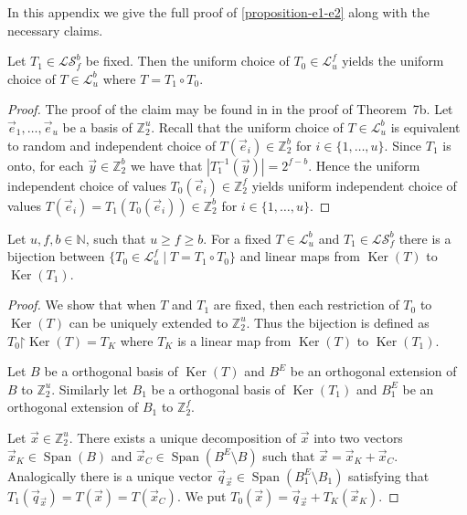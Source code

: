 \documentclass[unicode,review]{siamart1116}
\newcommand{\vecspace}[2]{\mathbb{Z}_{#1}^{#2}}
\newcommand{\binvecspace}[1]{\vecspace{2}{#1}}
\newcommand{\linearmaps}[2]{\mathcal{L}_{#1}^{#2}}
\newcommand{\surjectivelinearmaps}[2]{\mathcal{LS}_{#1}^{#2}}
\numberwithin{theorem}{section}
\begin{document}
\begin{appendix}
In this appendix we give the full proof of \cref{proposition-e1-e2} along with the necessary claims. 
\begin{proposition}
\label{claim-dstr-factor}
Let $T_1 \in \surjectivelinearmaps{f}{b}$ be fixed. Then the uniform choice of $T_0 \in \linearmaps{u}{f}$ yields the uniform choice of $T \in \linearmaps{u}{b}$ where $T = T_1 \circ T_0 $.
\end{proposition}
\begin{proof}
The proof of the claim may be found in \cite{alonetal} in the proof of Theorem~7b.
Let $\vec{e}_1, \dots, \vec{e}_u$ be a basis of $\binvecspace{u}$.
Recall that the uniform choice of $T \in \linearmaps{u}{b}$ is equivalent to random and independent choice of $T(\vec{e}_i) \in \binvecspace{b}$ for $i \in \{1, \dots, u\}$.
Since $T_1$ is onto, for each $\vec{y} \in \binvecspace{b}$ we have that $|T_1^{-1}(\vec{y})| = 2^{f - b}$.
Hence the uniform independent choice of values $T_0(\vec{e}_i) \in \binvecspace{f}$ yields uniform independent choice of values $T(\vec{e}_i) = T_1(T_0(\vec{e}_i)) \in \binvecspace{b}$ for $i \in \{1, \dots, u\}$.
\end{proof}

\begin{proposition}
\label{proposition-affine-model}
Let $u, f, b \in \mathbb{N}$, such that $u \geq f \geq b$.
For a fixed $T \in \linearmaps{u}{b}$ and $T_1 \in \surjectivelinearmaps{f}{b}$ there is a bijection between $\{ T_0 \in \linearmaps{u}{f} \mid T = T_1 \circ T_0 \}$ and linear maps from $\operatorname{Ker}(T)$ to $\operatorname{Ker}(T_1)$.
\end{proposition}
\begin{proof}
We show that when $T$ and $T_1$ are fixed, then each restriction of $T_0$ to $\operatorname{Ker}(T)$ can be uniquely extended to $\binvecspace{u}$.
Thus the bijection is defined as $T_0\mathord{\upharpoonright}\operatorname{Ker}(T) = T_K$ where $T_K$ is a linear map from $\operatorname{Ker}(T)$ to $\operatorname{Ker}(T_1)$.

Let $B$ be a orthogonal basis of $\operatorname{Ker}(T)$ and $B^E$ be an orthogonal extension of $B$ to $\binvecspace{u}$.
Similarly let $B_1$ be a orthogonal basis of $\operatorname{Ker}(T_1)$ and $B_1^E$ be an orthogonal extension of $B_1$ to $\binvecspace{f}$.

Let $\vec{x} \in \binvecspace{u}$.
There exists a unique decomposition of $\vec{x}$ into two vectors $\vec{x}_K \in \operatorname{Span}(B)$ and $\vec{x}_C \in \operatorname{Span}(B^E \setminus B)$ such that $\vec{x} = \vec{x}_K + \vec{x}_C$.
Analogically there is a unique vector $\vec{q}_{\vec{x}} \in \operatorname{Span}(B_1^E \setminus B_1)$ satisfying that $T_1(\vec{q}_{\vec{x}}) = T(\vec{x}) = T(\vec{x}_C)$.
We put $T_0(\vec{x}) = \vec{q}_{\vec{x}} + T_K(\vec{x}_K)$.
\end{proof}


\end{appendix}
\end{document}
